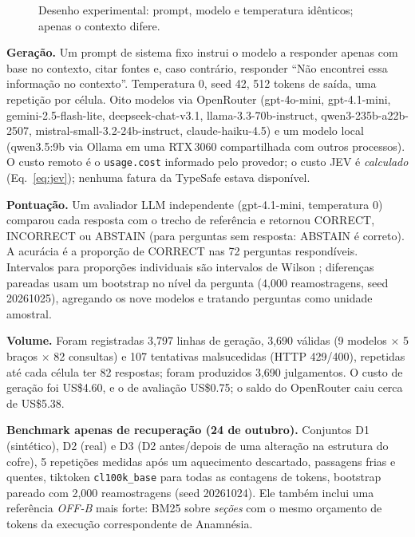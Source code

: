 \documentclass[conference,onecolumn,11pt]{IEEEtran}
\newcommand{\anam}{Anam\-n\'esia}
\begin{document}
\begin{figure}[!htbp]\centering
{}
\caption{Desenho experimental: prompt, modelo e temperatura idênticos; apenas o contexto difere.}\label{fig:design}
\end{figure}

\textbf{Geração.} Um prompt de sistema fixo instrui o modelo a responder apenas com base no contexto, citar fontes e, caso contrário, responder ``N\~ao encontrei essa informa\c{c}\~ao no contexto''. Temperatura 0, seed 42, 512 tokens de saída, uma repetição por célula. Oito modelos via OpenRouter \cite{openrouter} (gpt-4o-mini, gpt-4.1-mini, gemini-2.5-flash-lite, deepseek-chat-v3.1, llama-3.3-70b-instruct, qwen3-235b-a22b-2507, mistral-small-3.2-24b-instruct, claude-haiku-4.5) e um modelo local (qwen3.5:9b via Ollama em uma RTX\,3060 compartilhada com outros processos). O custo remoto é o \texttt{usage.cost} informado pelo provedor; o custo JEV é \emph{calculado} (Eq.~\ref{eq:jev}); nenhuma fatura da TypeSafe estava disponível.

\textbf{Pontuação.} Um avaliador LLM independente (gpt-4.1-mini, temperatura 0) comparou cada resposta com o trecho de referência e retornou CORRECT, INCORRECT ou ABSTAIN (para perguntas sem resposta: ABSTAIN é correto). A acurácia é a proporção de CORRECT nas 72 perguntas respondíveis. Intervalos para proporções individuais são intervalos de Wilson \cite{wilson1927}; diferenças pareadas usam um bootstrap no nível da pergunta \cite{efron1979bootstrap} (4,000 reamostragens, seed 20261025), agregando os nove modelos e tratando perguntas como unidade amostral.

\textbf{Volume.} Foram registradas 3,797 linhas de geração, 3,690 válidas (9 modelos $\times$ 5 braços $\times$ 82 consultas) e 107 tentativas malsucedidas (HTTP 429/400), repetidas até cada célula ter 82 respostas; foram produzidos 3,690 julgamentos. O custo de geração foi US\$4.60, e o de avaliação US\$0.75; o saldo do OpenRouter caiu cerca de US\$5.38.

\textbf{Benchmark apenas de recuperação (24 de outubro).} Conjuntos D1 (sintético), D2 (real) e D3 (D2 antes/depois de uma alteração na estrutura do cofre), 5 repetições medidas após um aquecimento descartado, passagens frias e quentes, tiktoken \texttt{cl100k\_base} para todas as contagens de tokens, bootstrap pareado com 2,000 reamostragens (seed 20261024). Ele também inclui uma referência \emph{OFF-B} mais forte: BM25 sobre \emph{seções} com o mesmo orçamento de tokens da execução correspondente de \anam{}.
\end{document}
